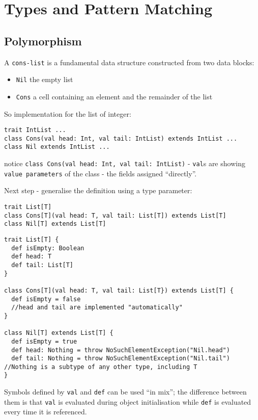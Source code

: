 \documentclass{scrartcl}
\newcommand{\term}[1]{\verb~#1~} %
\begin{document}

\section{Types and Pattern Matching}
\label{sec:TypesAndPMatching}
\subsection{Polymorphism}
\label{sec:Polymorphism}

A \term{cons-list} is a fundamental data structure constructed from two data
blocks:
\begin{itemize}
\item \lstinline|Nil| the empty list
\item \lstinline|Cons| a cell containing an element and the remainder of the
  list
\end{itemize}
So implementation for the list of integer:
\begin{lstlisting}
trait IntList ...
class Cons(val head: Int, val tail: IntList) extends IntList ...
class Nil extends IntList ...
\end{lstlisting}
notice \lstinline|class Cons(val head: Int, val tail: IntList)| -
\lstinline|val|s are showing \term{value parameters} of the class - the fields
assigned ``directly''.

Next step - generalise the definition using a type parameter:
\begin{lstlisting}
trait List[T]
class Cons[T](val head: T, val tail: List[T]) extends List[T]
class Nil[T] extends List[T]
\end{lstlisting}

\begin{lstlisting}
trait List[T] {
  def isEmpty: Boolean
  def head: T
  def tail: List[T]
}

class Cons[T](val head: T, val tail: List[T}) extends List[T] {
  def isEmpty = false
  //head and tail are implemented "automatically"
}

class Nil[T] extends List[T] {
  def isEmpty = true
  def head: Nothing = throw NoSuchElementException("Nil.head")
  def tail: Nothing = throw NoSuchElementException("Nil.tail")
//Nothing is a subtype of any other type, including T
}
\end{lstlisting}

Symbols defined by \lstinline|val| and \lstinline|def| can be used ``in mix'';
the difference between them is that \lstinline|val| is evaluated during object
initialisation while \lstinline|def| is evaluated every time it is referenced.
\end{document}
